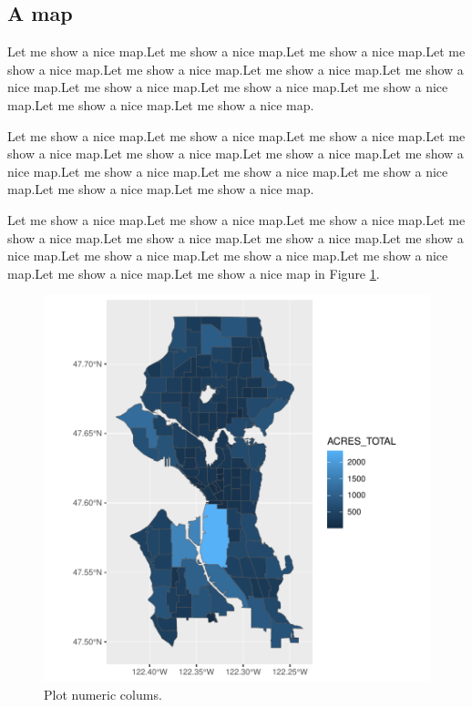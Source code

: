 \documentclass[a4paper, 12pt]{article}
\begin{document}
\subsection{A map}\label{mapPlot}

Let me show a nice map.Let me show a nice map.Let me show a nice map.Let me show a nice map.Let me show a nice map.Let me show a nice map.Let me show a nice map.Let me show a nice map.Let me show a nice map.Let me show a nice map.Let me show a nice map.Let me show a nice map.

Let me show a nice map.Let me show a nice map.Let me show a nice map.Let me show a nice map.Let me show a nice map.Let me show a nice map.Let me show a nice map.Let me show a nice map.Let me show a nice map.Let me show a nice map.Let me show a nice map.Let me show a nice map.

Let me show a nice map.Let me show a nice map.Let me show a nice map.Let me show a nice map.Let me show a nice map.Let me show a nice map.Let me show a nice map.Let me show a nice map.Let me show a nice map.Let me show a nice map.Let me show a nice map.Let me show a nice map in Figure \ref{plot-cityMap}.


\begin{figure}[h]
\centering
\begin{adjustbox}{width=10cm,height=10cm} 
\includegraphics{WorkInR_forPrinter-plot-cityMap}
\end{adjustbox}
\caption{Plot numeric colums.}  
\label{plot-cityMap} 
\end{figure}
\end{document}
